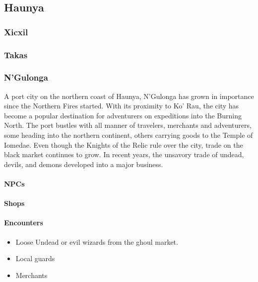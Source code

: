 	\subsection{Haunya}

		\subsubsection{Xicxil}
	
		\subsubsection{Takas}
	
		\subsubsection{N'Gulonga}

		A port city on the northern coast of Haunya, N'Gulonga has grown 
		in importance since the Northern Fires started.  With its proximity
		to Ko' Rau, the city has become a popular destination for adventurers
		on expeditions into the Burning North.  The port bustles with all
		manner of travelers, merchants and adventurers, some heading into 
		the northern continent, others carrying goods to the Temple of 
		Iomedae.  Even though the Knights of the Relic rule over the city,
		trade on the black market continues to grow.  In recent years, the 
		unsavory trade of undead, devils, and demons developed into a major 
		business.  

			\paragraph{NPCs}
				
			
			\paragraph{Shops}

			\paragraph{Encounters}
				
				\begin{itemize}
					\item Loose Undead or evil wizards from the 
						ghoul market.
					\item Local guards
					\item Merchants
				\end{itemize}

